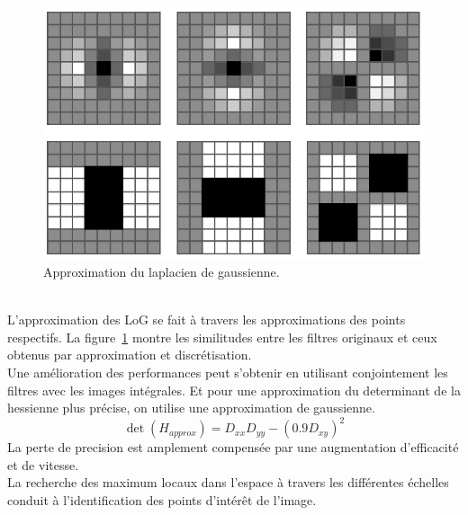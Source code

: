 \documentclass[a4paper,11pt]{report}
\begin{document}
\begin{figure}[ht]
\centering
\includegraphics[scale=0.3]{figure3.png}
\caption{Approximation du laplacien de gaussienne.}
\label{fig3}
\end{figure}
\\L'approximation des LoG se fait à travers les approximations des points respectifs. La figure~\ref{fig3} montre les similitudes entre les filtres originaux et ceux obtenus par approximation et discrétisation.
\\Une amélioration des performances peut s'obtenir en utilisant conjointement les filtres avec les images intégrales. Et pour une approximation du determinant de la hessienne plus précise, on utilise une approximation de gaussienne.
$$\det(H_{approx})=D_{xx}D_{yy}-(0.9D_{xy})^2$$
La perte de precision est amplement compensée par une augmentation d'efficacité et de vitesse.
\\La recherche des maximum locaux dans l'espace à travers les différentes échelles conduit à l'identification des points d'intérêt de l'image.
\end{document}
